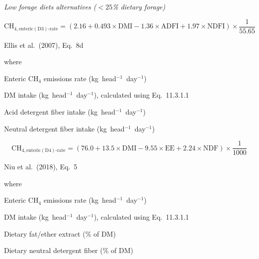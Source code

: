 \noindent\textit{Low forage diets alternatives ($< 25$\% dietary forage)}

\begin{equation}
    \mathrm{CH}_{4,\mathrm{enteric}(\mathrm{D3})\mathrm{\text{-}rate}} =
        \left(2.16 + 0.493 \times \mathrm{DMI}
            - 1.36 \times \mathrm{ADFI}
            + 1.97 \times \mathrm{NDFI}\right)
        \times \frac{1}{55.65}
    \tag{Eq.\ 3.2.1.15}
\end{equation}

\noindent Ellis et al.\ (2007), Eq.~8d

\noindent where
\begin{description}[font=\normalfont, leftmargin=9em, style=sameline, nosep]
    \item[$\mathrm{CH}_{4,\mathrm{enteric}(\mathrm{D3})\mathrm{\text{-}rate}}$]
          Enteric CH$_4$ emissions rate (kg~head$^{-1}$~day$^{-1}$)
    \item[$\mathrm{DMI}$] DM intake (kg~head$^{-1}$~day$^{-1}$), calculated using
          Eq.~11.3.1.1
    \item[$\mathrm{ADFI}$] Acid detergent fiber intake (kg~head$^{-1}$~day$^{-1}$)
    \item[$\mathrm{NDFI}$] Neutral detergent fiber intake (kg~head$^{-1}$~day$^{-1}$)
\end{description}

\begin{equation}
    \mathrm{CH}_{4,\mathrm{enteric}(\mathrm{D4})\mathrm{\text{-}rate}} =
        \left(76.0 + 13.5 \times \mathrm{DMI}
            - 9.55 \times \mathrm{EE}
            + 2.24 \times \mathrm{NDF}\right)
        \times \frac{1}{1000}
    \tag{Eq.\ 3.2.1.16}
\end{equation}

\noindent Niu et al.\ (2018), Eq.~5

\noindent where
\begin{description}[font=\normalfont, leftmargin=9em, style=sameline, nosep]
    \item[$\mathrm{CH}_{4,\mathrm{enteric}(\mathrm{D4})\mathrm{\text{-}rate}}$]
          Enteric CH$_4$ emissions rate (kg~head$^{-1}$~day$^{-1}$)
    \item[$\mathrm{DMI}$] DM intake (kg~head$^{-1}$~day$^{-1}$), calculated using
          Eq.~11.3.1.1
    \item[$\mathrm{EE}$] Dietary fat/ether extract (\% of DM)
    \item[$\mathrm{NDF}$] Dietary neutral detergent fiber (\% of DM)
\end{description}

